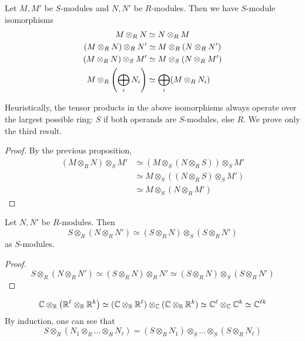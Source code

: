 \begin{proposition}
    Let \( M, M' \) be \( S \)-modules and \( N, N' \) be \( R \)-modules.
    Then we have \( S \)-module isomorphisms
    \begin{align*}
        M \otimes_R N &\simeq N \otimes_R M \\
        (M \otimes_R N) \otimes_R N' &\simeq M \otimes_R (N \otimes_R N') \\
        (M \otimes_R N) \otimes_S M' &\simeq M \otimes_S (N \otimes_R M') \\
        M \otimes_R \qty(\bigoplus_i N_i) &\simeq \bigoplus_i (M \otimes_R N_i)
    \end{align*}
\end{proposition}
Heuristically, the tensor products in the above isomorphisms always operate over the largest possible ring: \( S \) if both operands are \( S \)-modules, else \( R \).
We prove only the third result.
\begin{proof}
    By the previous proposition,
    \begin{align*}
        (M \otimes_R N) \otimes_S M' &\simeq (M \otimes_S (N \otimes_R S)) \otimes_S M' \\
        &\simeq M \otimes_S ((N \otimes_R S) \otimes_S M') \\
        &\simeq M \otimes_S (N \otimes_R M')
    \end{align*}
\end{proof}
\begin{corollary}
    Let \( N, N' \) be \( R \)-modules.
    Then
    \[ S \otimes_R (N \otimes_R N') \simeq (S \otimes_R N) \otimes_S (S \otimes_R N') \]
    as \( S \)-modules.
\end{corollary}
\begin{proof}
    \[ S \otimes_R (N \otimes_R N') \simeq (S \otimes_R N) \otimes_R N' \simeq (S \otimes_R N) \otimes_S (S \otimes_R N') \]
\end{proof}
\begin{example}
    \[ \mathbb C \otimes_{\mathbb R} \qty(\mathbb R^\ell \otimes_{\mathbb R} \mathbb R^k) \simeq (\mathbb C \otimes_{\mathbb R} \mathbb R^\ell) \otimes_{\mathbb C} (\mathbb C \otimes_{\mathbb R} \mathbb R^k) \simeq \mathbb C^\ell \otimes_{\mathbb C} \mathbb C^k \simeq \mathbb C^{\ell k} \]
    By induction, one can see that
    \[ S \otimes_R (N_1 \otimes_R \dots \otimes_R N_\ell) = (S \otimes_R N_1) \otimes_S \dots \otimes_S (S \otimes_R N_\ell) \]
\end{example}

